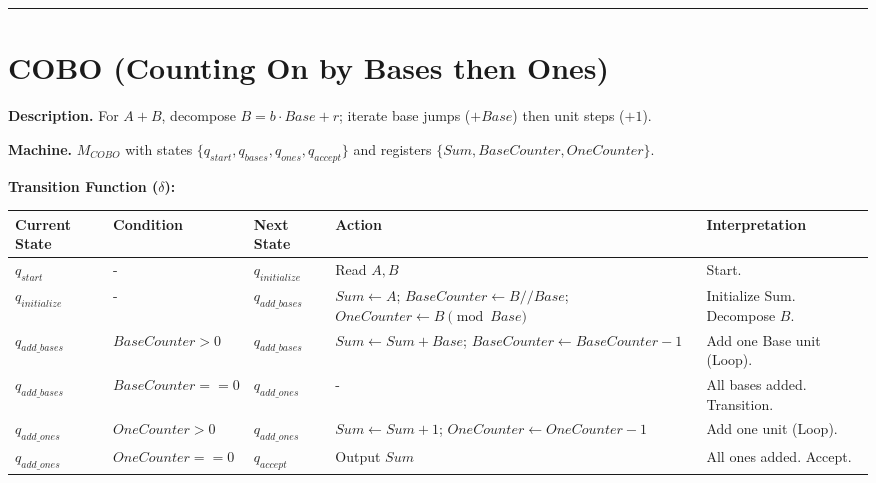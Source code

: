 \documentclass[12pt]{book}
\begin{document}
\begin{center}\rule{0.5\linewidth}{0.5pt}\end{center}

\section{COBO (Counting On by Bases then
Ones)}\label{cobo-counting-on-by-bases-then-ones}

\textbf{Description.} For \(A + B\), decompose \(B = b \cdot Base + r\);
iterate base jumps (\(+Base\)) then unit steps (\(+1\)).

\textbf{Machine.} \(M_{COBO}\) with states
\(\{q_{start}, q_{bases}, q_{ones}, q_{accept}\}\) and registers
\(\{Sum, BaseCounter, OneCounter\}\).

\textbf{Transition Function (\(\delta\)):}

\begin{longtable}[]{@{}
  >{\raggedright\arraybackslash}p{}
  >{\raggedright\arraybackslash}p{}
  >{\raggedright\arraybackslash}p{}
  >{\raggedright\arraybackslash}p{}
  >{\raggedright\arraybackslash}p{}@{}}
\toprule\noalign{}
\begin{minipage}[b]{\linewidth}\raggedright
Current State
\end{minipage} & \begin{minipage}[b]{\linewidth}\raggedright
Condition
\end{minipage} & \begin{minipage}[b]{\linewidth}\raggedright
Next State
\end{minipage} & \begin{minipage}[b]{\linewidth}\raggedright
Action
\end{minipage} & \begin{minipage}[b]{\linewidth}\raggedright
Interpretation
\end{minipage} \\
\midrule\noalign{}
\endhead
\bottomrule\noalign{}
\endlastfoot
\(q_{start}\) & - & \(q_{initialize}\) & Read \(A, B\) & Start. \\
\(q_{initialize}\) & - & \(q_{add\_bases}\) & \(Sum \leftarrow A\);
\(BaseCounter \leftarrow B // Base\);
\(OneCounter \leftarrow B \pmod{Base}\) & Initialize Sum. Decompose
\(B\). \\
\(q_{add\_bases}\) & \(BaseCounter > 0\) & \(q_{add\_bases}\) &
\(Sum \leftarrow Sum + Base\);
\(BaseCounter \leftarrow BaseCounter - 1\) & Add one Base unit
(Loop). \\
\(q_{add\_bases}\) & \(BaseCounter == 0\) & \(q_{add\_ones}\) & - & All
bases added. Transition. \\
\(q_{add\_ones}\) & \(OneCounter > 0\) & \(q_{add\_ones}\) &
\(Sum \leftarrow Sum + 1\); \(OneCounter \leftarrow OneCounter - 1\) &
Add one unit (Loop). \\
\(q_{add\_ones}\) & \(OneCounter == 0\) & \(q_{accept}\) & Output
\(Sum\) & All ones added. Accept. \\
\end{longtable}
\end{document}
